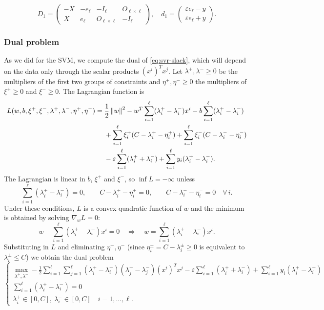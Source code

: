 \[
D_1 = \begin{pmatrix} -X & -e_\ell & -I_\ell & O_{\ell\times\ell}\\ X & e_\ell & O_{\ell\times\ell} & -I_\ell \end{pmatrix},\quad
d_1 = \begin{pmatrix} \varepsilon e_\ell - y\\ \varepsilon e_\ell + y \end{pmatrix}.
\]

\subsubsection{Dual problem}

As we did for the SVM, we compute the dual of \eqref{eq:svr-slack}, which will depend on the data only through the scalar products $(x^i)^Tx^j$. Let $\lambda^+,\lambda^-\ge 0$ be the multipliers of the first two groups of constraints and $\eta^+,\eta^-\ge 0$ the multipliers of $\xi^+\ge 0$ and $\xi^-\ge0$. The Lagrangian function is
\begin{align*}
L(w,b,\xi^+,\xi^-,\lambda^+,\lambda^-,\eta^+,\eta^-) ={}& \frac{1}{2}\left\lVert w \right\rVert^2 - w^T\sum_{i=1}^{\ell}(\lambda_i^+ - \lambda_i^-)x^i - b\sum_{i=1}^{\ell}(\lambda_i^+ - \lambda_i^-)\\
&+ \sum_{i=1}^{\ell}\xi_i^+(C - \lambda_i^+ - \eta_i^+) + \sum_{i=1}^{\ell}\xi_i^-(C - \lambda_i^- - \eta_i^-)\\
&- \varepsilon\sum_{i=1}^{\ell}(\lambda_i^+ + \lambda_i^-) + \sum_{i=1}^{\ell}y_i(\lambda_i^+ - \lambda_i^-).
\end{align*}
The Lagrangian is linear in $b$, $\xi^+$ and $\xi^-$, so $\inf L = -\infty$ unless
\[
\sum_{i=1}^{\ell}(\lambda_i^+ - \lambda_i^-) = 0,\qquad C - \lambda_i^+ - \eta_i^+ = 0,\qquad C - \lambda_i^- - \eta_i^- = 0 \quad \forall\, i.
\]
Under these conditions, $L$ is a convex quadratic function of $w$ and the minimum is obtained by solving $\nabla_w L = 0$:
\[
w - \sum_{i=1}^{\ell}(\lambda_i^+ - \lambda_i^-)x^i = 0
\quad\Longrightarrow\quad
w = \sum_{i=1}^{\ell}(\lambda_i^+ - \lambda_i^-)x^i.
\]
Substituting in $L$ and eliminating $\eta^+,\eta^-$ (since $\eta_i^\pm = C - \lambda_i^\pm \ge 0$ is equivalent to $\lambda_i^\pm \le C$) we obtain the dual problem
\[
\begin{cases}
\displaystyle \max_{\lambda^+,\lambda^-} -\frac{1}{2}\sum_{i=1}^{\ell}\sum_{j=1}^{\ell}(\lambda_i^+ - \lambda_i^-)(\lambda_j^+ - \lambda_j^-)(x^i)^Tx^j - \varepsilon\sum_{i=1}^{\ell}(\lambda_i^+ + \lambda_i^-) + \sum_{i=1}^{\ell}y_i(\lambda_i^+ - \lambda_i^-)\\[1ex]
\displaystyle \sum_{i=1}^{\ell}(\lambda_i^+ - \lambda_i^-) = 0\\[1ex]
\lambda_i^+ \in [0,C],\ \lambda_i^- \in [0,C] \quad i=1,\dots,\ell.
\end{cases}
\]

